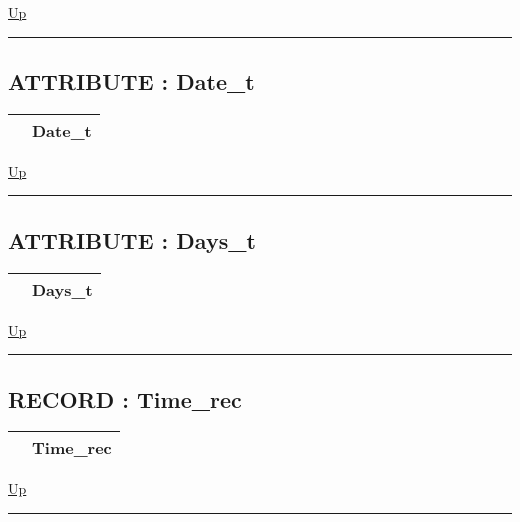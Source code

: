 \hyperlink{ecldoc:Date}{Up}

\par


\rule{\textwidth}{0.4pt}
\subsection*{ATTRIBUTE : Date\_t}
\hypertarget{ecldoc:date.date_t}{}

{\renewcommand{\arraystretch}{1.5}
\begin{tabularx}{\textwidth}{|>{\raggedright\arraybackslash}l|X|}
\hline
\hspace{0pt} & Date\_t \\
\hline
\end{tabularx}
}

\hyperlink{ecldoc:Date}{Up}

\par


\rule{\textwidth}{0.4pt}
\subsection*{ATTRIBUTE : Days\_t}
\hypertarget{ecldoc:date.days_t}{}

{\renewcommand{\arraystretch}{1.5}
\begin{tabularx}{\textwidth}{|>{\raggedright\arraybackslash}l|X|}
\hline
\hspace{0pt} & Days\_t \\
\hline
\end{tabularx}
}

\hyperlink{ecldoc:Date}{Up}

\par


\rule{\textwidth}{0.4pt}
\subsection*{RECORD : Time\_rec}
\hypertarget{ecldoc:date.time_rec}{}

{\renewcommand{\arraystretch}{1.5}
\begin{tabularx}{\textwidth}{|>{\raggedright\arraybackslash}l|X|}
\hline
\hspace{0pt} & Time\_rec \\
\hline
\end{tabularx}
}

\hyperlink{ecldoc:Date}{Up}

\par


\rule{\textwidth}{0.4pt}
